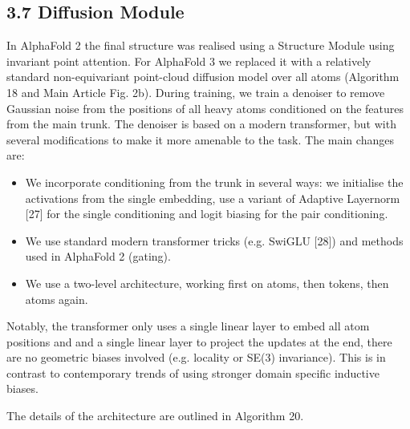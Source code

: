 \documentclass[10pt]{article}
\begin{document}
\subsection*{3.7 Diffusion Module}
In AlphaFold 2 the final structure was realised using a Structure Module using invariant point attention. For AlphaFold 3 we replaced it with a relatively standard non-equivariant point-cloud diffusion model over all atoms (Algorithm 18 and Main Article Fig. 2b). During training, we train a denoiser to remove Gaussian noise from the positions of all heavy atoms conditioned on the features from the main trunk. The denoiser is based on a modern transformer, but with several modifications to make it more amenable to the task. The main changes are:

\begin{itemize}
  \item We incorporate conditioning from the trunk in several ways: we initialise the activations from the single embedding, use a variant of Adaptive Layernorm [27] for the single conditioning and logit biasing for the pair conditioning.
  \item We use standard modern transformer tricks (e.g. SwiGLU [28]) and methods used in AlphaFold 2 (gating).
  \item We use a two-level architecture, working first on atoms, then tokens, then atoms again.
\end{itemize}

Notably, the transformer only uses a single linear layer to embed all atom positions and and a single linear layer to project the updates at the end, there are no geometric biases involved (e.g. locality or SE(3) invariance). This is in contrast to contemporary trends of using stronger domain specific inductive biases.

The details of the architecture are outlined in Algorithm 20.
\end{document}
